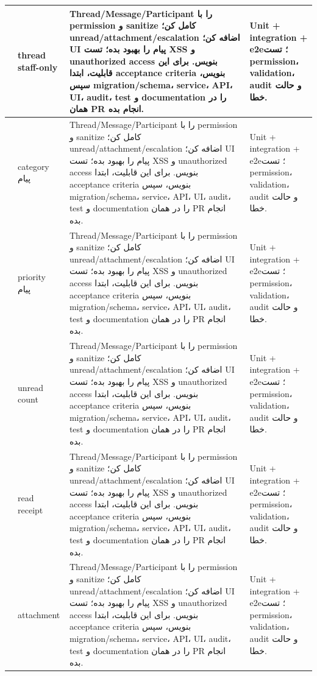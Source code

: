 \documentclass[11pt,a4paper]{article}
\begin{document}
\begin{longtable}{|>{\raggedleft\arraybackslash}p{}|>{\raggedleft\arraybackslash}p{}|>{\raggedleft\arraybackslash}p{}|>{\raggedleft\arraybackslash}p{}|}
144 & thread staff-only & Thread/Message/Participant را با permission و sanitize کامل کن؛ unread/attachment/escalation اضافه کن؛ UI پیام را بهبود بده؛ تست XSS و unauthorized access بنویس. برای این قابلیت، ابتدا acceptance criteria بنویس، سپس migration/schema، service، API، UI، audit، test و documentation را در همان PR انجام بده. & Unit + integration + e2e؛ تست permission، validation، audit و حالت خطا. \\ \hline
145 & category پیام & Thread/Message/Participant را با permission و sanitize کامل کن؛ unread/attachment/escalation اضافه کن؛ UI پیام را بهبود بده؛ تست XSS و unauthorized access بنویس. برای این قابلیت، ابتدا acceptance criteria بنویس، سپس migration/schema، service، API، UI، audit، test و documentation را در همان PR انجام بده. & Unit + integration + e2e؛ تست permission، validation، audit و حالت خطا. \\ \hline
146 & priority پیام & Thread/Message/Participant را با permission و sanitize کامل کن؛ unread/attachment/escalation اضافه کن؛ UI پیام را بهبود بده؛ تست XSS و unauthorized access بنویس. برای این قابلیت، ابتدا acceptance criteria بنویس، سپس migration/schema، service، API، UI، audit، test و documentation را در همان PR انجام بده. & Unit + integration + e2e؛ تست permission، validation، audit و حالت خطا. \\ \hline
147 & unread count & Thread/Message/Participant را با permission و sanitize کامل کن؛ unread/attachment/escalation اضافه کن؛ UI پیام را بهبود بده؛ تست XSS و unauthorized access بنویس. برای این قابلیت، ابتدا acceptance criteria بنویس، سپس migration/schema، service، API، UI، audit، test و documentation را در همان PR انجام بده. & Unit + integration + e2e؛ تست permission، validation، audit و حالت خطا. \\ \hline
148 & read receipt & Thread/Message/Participant را با permission و sanitize کامل کن؛ unread/attachment/escalation اضافه کن؛ UI پیام را بهبود بده؛ تست XSS و unauthorized access بنویس. برای این قابلیت، ابتدا acceptance criteria بنویس، سپس migration/schema، service، API، UI، audit، test و documentation را در همان PR انجام بده. & Unit + integration + e2e؛ تست permission، validation، audit و حالت خطا. \\ \hline
149 & attachment & Thread/Message/Participant را با permission و sanitize کامل کن؛ unread/attachment/escalation اضافه کن؛ UI پیام را بهبود بده؛ تست XSS و unauthorized access بنویس. برای این قابلیت، ابتدا acceptance criteria بنویس، سپس migration/schema، service، API، UI، audit، test و documentation را در همان PR انجام بده. & Unit + integration + e2e؛ تست permission، validation، audit و حالت خطا. \\ \hline

\end{longtable}
\end{document}
